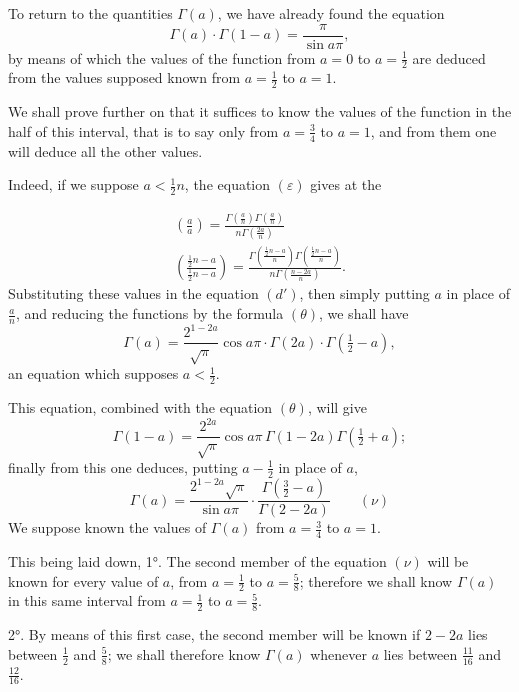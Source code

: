 \documentclass{article}
\begin{document}
To return to the quantities $\Gamma(a)$, we have already found the equation
\[ \Gamma(a)\cdot\Gamma(1-a)=\frac{\pi}{\sin a\pi}, \]
by means of which the values of the function from $a=0$ to $a=\frac{1}{2}$ are deduced from the values supposed known from $a=\frac{1}{2}$ to $a=1$.

We shall prove further on that it suffices to know the values of the function in the half of this interval, that is to say only from $a=\frac{3}{4}$ to $a=1$, and from them one will deduce all the other values.

Indeed, if we suppose $a<\frac{1}{2}n$, the equation $(\varepsilon)$ gives at the

\[ \begin{gathered} \left(\frac{a}{a}\right)=\frac{\Gamma\left(\frac{a}{n}\right)\Gamma\left(\frac{a}{n}\right)}{n\Gamma\left(\frac{2a}{n}\right)}\\ \left(\frac{\tfrac{1}{2}n-a}{\tfrac{1}{2}n-a}\right)=\frac{\Gamma\left(\frac{\tfrac{1}{2}n-a}{n}\right)\Gamma\left(\frac{\tfrac{1}{2}n-a}{n}\right)}{n\Gamma\left(\frac{n-2a}{n}\right)}. \end{gathered} \]
Substituting these values in the equation $(d')$, then simply putting $a$ in place of $\frac{a}{n}$, and reducing the functions by the formula $(\theta)$, we shall have
\[ \Gamma(a)=\frac{2^{1-2a}}{\sqrt{\pi}}\cos a\pi\cdot\Gamma(2a)\cdot\Gamma\left(\tfrac{1}{2}-a\right), \]
an equation which supposes $a<\frac{1}{2}$.

This equation, combined with the equation $(\theta)$, will give
\[ \Gamma(1-a)=\frac{2^{2a}}{\sqrt{\pi}}\cos a\pi\,\Gamma(1-2a)\Gamma\left(\tfrac{1}{2}+a\right); \]
finally from this one deduces, putting $a-\frac{1}{2}$ in place of $a$,
\[ \Gamma(a)=\frac{2^{1-2a}\sqrt{\pi}}{\sin a\pi}\cdot\frac{\Gamma\left(\tfrac{3}{2}-a\right)}{\Gamma(2-2a)}\qquad(\nu) \]
We suppose known the values of $\Gamma(a)$ from $a=\frac{3}{4}$ to $a=1$.

This being laid down, 1°. The second member of the equation $(\nu)$ will be known for every value of $a$, from $a=\frac{1}{2}$ to $a=\frac{5}{8}$; therefore we shall know $\Gamma(a)$ in this same interval from $a=\frac{1}{2}$ to $a=\frac{5}{8}$.

2°. By means of this first case, the second member will be known if $2-2a$ lies between $\frac{1}{2}$ and $\frac{5}{8}$; we shall therefore know $\Gamma(a)$ whenever $a$ lies between $\frac{11}{16}$ and $\frac{12}{16}$.
\end{document}
